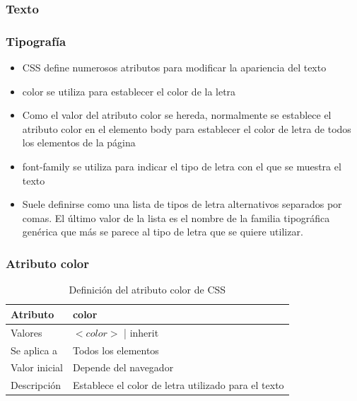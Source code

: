 \documentclass[ucs]{beamer}
\begin{document}
\subsubsection*{Texto}

\begin{frame}
\frametitle{Tipografía}

\begin{itemize}
  \item CSS define numerosos atributos para modificar la apariencia del texto
  \item color se utiliza para establecer el color de la letra
  \item Como el valor del atributo color se hereda, normalmente se establece el atributo color en el elemento body para establecer el color de letra de todos los elementos de la página
 \item font-family se utiliza para indicar el tipo de letra con el que se muestra el texto
  \item Suele definirse como una lista de tipos de letra alternativos separados por comas. El último valor de la lista es el nombre de la familia tipográfica genérica que más se parece al tipo de letra que se quiere utilizar.
\end{itemize}

\end{frame}



\begin{frame}
\frametitle{Atributo color}

\begin{center}
  \begin{table}
   \begin{tabular}{p{1.8cm}p{7.8cm}}
Atributo & \bf{color} \\ \hline
Valores& $<color>$ | inherit \\ \hline
Se aplica a& Todos los elementos \\ \hline
Valor inicial& Depende del navegador \\ \hline
Descripción& Establece el color de letra utilizado para el texto \\ \hline
  \end{tabular}
   \caption{Definición del atributo color de CSS}
 \end{table}
\end{center}


\end{frame}
\end{document}
